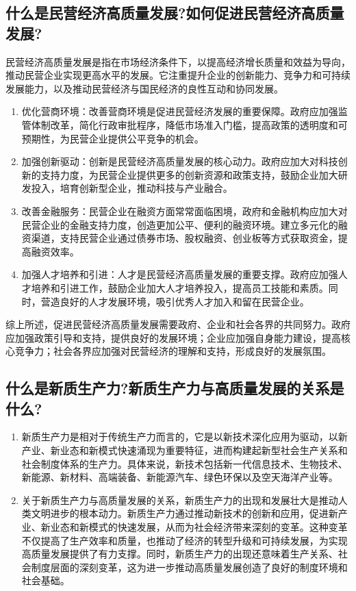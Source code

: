 \documentclass{article}
\begin{document}
\subsection{什么是民营经济高质量发展?如何促进民营经济高质量发展?}

民营经济高质量发展是指在市场经济条件下，以提高经济增长质量和效益为导向，推动民营企业实现更高水平的发展。它注重提升企业的创新能力、竞争力和可持续发展能力，以及推动民营经济与国民经济的良性互动和协同发展。
\begin{enumerate}
	\item 优化营商环境：改善营商环境是促进民营经济发展的重要保障。政府应加强监管体制改革，简化行政审批程序，降低市场准入门槛，提高政策的透明度和可预期性，为民营企业提供公平竞争的机会。
	\item  加强创新驱动：创新是民营经济高质量发展的核心动力。政府应加大对科技创新的支持力度，为民营企业提供更多的创新资源和政策支持，鼓励企业加大研发投入，培育创新型企业，推动科技与产业融合。
	\item 改善金融服务：民营企业在融资方面常常面临困境，政府和金融机构应加大对民营企业的金融支持力度，创造更加公平、便利的融资环境。建立多元化的融资渠道，支持民营企业通过债券市场、股权融资、创业板等方式获取资金，提高融资效率。
	\item 加强人才培养和引进：人才是民营经济高质量发展的重要支撑。政府应加强人才培养和引进工作，鼓励企业加大人才培养投入，提高员工技能和素质。同时，营造良好的人才发展环境，吸引优秀人才加入和留在民营企业。
\end{enumerate}

综上所述，促进民营经济高质量发展需要政府、企业和社会各界的共同努力。政府应加强政策引导和支持，提供良好的发展环境；企业应加强自身能力建设，提高核心竞争力；社会各界应加强对民营经济的理解和支持，形成良好的发展氛围。


\subsection{什么是新质生产力?新质生产力与高质量发展的关系是什么?}
\begin{enumerate}
	\item 新质生产力是相对于传统生产力而言的，它是以新技术深化应用为驱动，以新产业、新业态和新模式快速涌现为重要特征，进而构建起新型社会生产关系和社会制度体系的生产力。具体来说，新技术包括新一代信息技术、生物技术、新能源、新材料、高端装备、新能源汽车、绿色环保以及空天海洋产业等。
	\item  关于新质生产力与高质量发展的关系，新质生产力的出现和发展壮大是推动人类文明进步的根本动力。新质生产力通过推动新技术的创新和应用，促进新产业、新业态和新模式的快速发展，从而为社会经济带来深刻的变革。这种变革不仅提高了生产效率和质量，也推动了经济的转型升级和可持续发展，为实现高质量发展提供了有力支撑。同时，新质生产力的出现还意味着生产关系、社会制度层面的深刻变革，这为进一步推动高质量发展创造了良好的制度环境和社会基础。
\end{enumerate}
\end{document}
